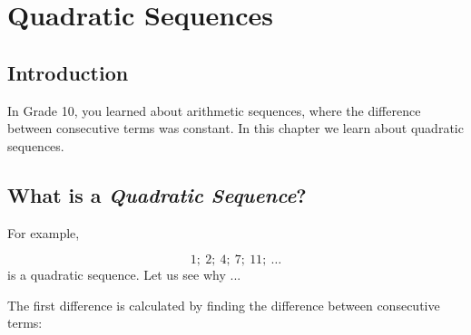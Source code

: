 \chapter{Quadratic Sequences}
\label{m:pin:g11}


\section{Introduction}
In Grade 10, you learned about arithmetic sequences, where the difference between consecutive terms was constant. In this chapter we learn about quadratic sequences.

\section{What is a \textit{Quadratic Sequence}?}


For example, 

\begin{equation}
\label{eq:mp:s:quadseq:1}
1; \: 2; \: 4; \: 7; \: 11; \: \ldots
\end{equation}
is a quadratic sequence. Let us see why ... 

The first difference is calculated by finding the difference between consecutive terms:

